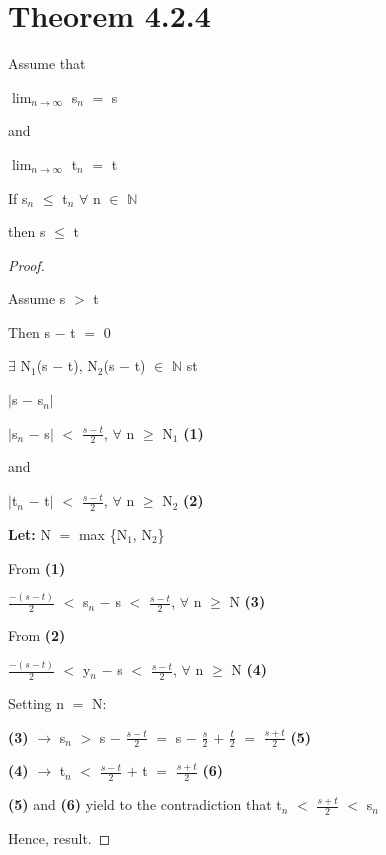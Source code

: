 \documentclass{article}
\newcommand{\mt}[1]{\ensuremath{#1}}
\newcommand\bsc[2][\DefaultOpt]{%
  \def\DefaultOpt{#2}%
  \section[#1]{#2}%
}
\newcommand{\bgpf}{\begin{proof} $ $\newline}
\newcommand{\lt}[1]{\textbf{Let: } #1}
\newcommand{\bpth}[1]{\textbf{(#1)}}
\newcommand{\epf}{\end{proof}}
\newcommand{\bn}{\mt{\mathbb{N}} }       %
\newcommand{\fa}{\mt{\forall} }          %
\newcommand{\mem}{\mt{\in} }
\newcommand{\exs}{\mt{\exists} }
\newcommand{\lra}{ \mt{\longrightarrow} } %
\newcommand{\eql}{\mt{=} }
\newcommand{\uw}[2]{#1\mt{_{#2}}}
\newcommand{\frc}[2]{\mt{\frac{#1}{#2}}}
\newcommand{\lmti}[1]{\mt{\displaystyle{\lim_{#1 \to \infty}}}}
\begin{document}
\bsc{Theorem 4.2.4}{

Assume that

\lmti{n} \uw{s}{n} \eql s

and

\lmti{n} \uw{t}{n} \eql t

If \uw{s}{n} $\leq$ \uw{t}{n} \fa n \mem \bn

then s $\leq$ t

\bgpf

Assume s $>$ t

Then s $-$ t \eql 0

\exs \uw{N}{1}(s $-$ t), \uw{N}{2}(s $-$ t) \mem \bn st

$|$s $-$ \uw{s}{n}$|$

$|$\uw{s}{n} $-$ s$|$ $<$ \frc{s - t}{2}, \fa n $\geq$ \uw{N}{1} \bpth{1}

and

$|$\uw{t}{n} $-$ t$|$ $<$ \frc{s - t}{2}, \fa n $\geq$ \uw{N}{2} \bpth{2}

\lt{N \eql max \{\uw{N}{1}, \uw{N}{2}\}}

From \bpth{1}

$\frac{-(s - t)}{2}$ $<$ \uw{s}{n} $-$ s $<$ $\frac{s - t}{2}$, \fa n $\geq$ N \bpth{3}

From \bpth{2}

$\frac{-(s - t)}{2}$ $<$ \uw{y}{n} $-$ s $<$ $\frac{s - t}{2}$, \fa n $\geq$ N \bpth{4}

Setting n \eql N:

\bpth{3} \lra \uw{s}{n} $>$ s $-$ \frc{s - t}{2} \eql s $-$ \frc{s}{2} $+$ \frc{t}{2} \eql \frc{s + t}{2} \bpth{5}

\bpth{4} \lra \uw{t}{n} $<$ \frc{s - t}{2} $+$ t \eql \frc{s + t}{2} \bpth{6}

\bpth{5} and \bpth{6} yield to the contradiction that \uw{t}{n} $<$ \frc{s + t}{2} $<$ \uw{s}{n}

Hence, result.

\epf

}
\end{document}
